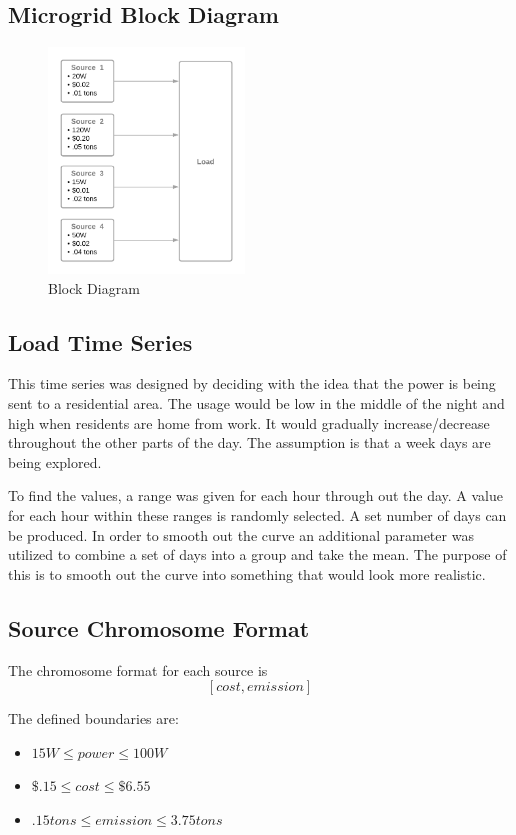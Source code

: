 \documentclass[conference]{IEEEtran}
\begin{document}
    \subsection{Microgrid Block Diagram}
    \begin{figure}[h!]
    \begin{center}
        \includegraphics[height=6cm]{graphics/block_diagram.png}
    \end{center}
    \caption{Block Diagram}
    \label{fig:block}
    \end{figure}

    \subsection{Load Time Series}
    This time series was designed by deciding with the idea that the power is being sent to a residential area.  The usage would be low in the middle
    of the night and high when residents are home from work.  It would gradually
    increase/decrease throughout the other parts of the day.  The assumption
    is that a week days are being explored.

    To find the values, a range was given for each hour through out the day.
    A value for each hour within these ranges is randomly selected.  A set
    number of days can be produced.  In order to smooth out the curve an additional parameter was utilized to combine a set of days into a group and take the mean.  The purpose of this is to smooth out the curve into something that would look more realistic.

    \subsection{Source Chromosome Format}
    The chromosome format for each source is
    \[[cost, emission]\]

    The defined boundaries are:
    \begin{itemize}
        \item \(15W \leq power \leq 100W\)
        \item \(\$.15 \leq cost \leq \$6.55\)
        \item \(.15 tons \leq emission \leq 3.75 tons\)
    \end{itemize}
\end{document}
